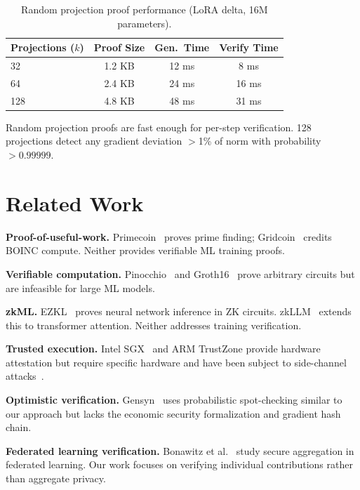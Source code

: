 \documentclass[11pt,letterpaper]{article}
\begin{document}
\begin{table}[t]
\centering
\begin{tabular}{lccc}
\toprule
\textbf{Projections ($k$)} & \textbf{Proof Size} & \textbf{Gen.\ Time} & \textbf{Verify Time} \\
\midrule
32 & 1.2 KB & 12 ms & 8 ms \\
64 & 2.4 KB & 24 ms & 16 ms \\
128 & 4.8 KB & 48 ms & 31 ms \\
\bottomrule
\end{tabular}
\caption{Random projection proof performance (LoRA delta, 16M parameters).}
\label{tab:projection}
\end{table}

Random projection proofs are fast enough for per-step verification.  128 projections detect any gradient deviation $>$1\% of norm with probability $>0.99999$.

\section{Related Work}

\textbf{Proof-of-useful-work.}  Primecoin~\cite{king2013primecoin} proves prime finding; Gridcoin~\cite{gridcoin2014} credits BOINC compute.  Neither provides verifiable ML training proofs.

\textbf{Verifiable computation.}  Pinocchio~\cite{parno2013pinocchio} and Groth16~\cite{groth2016size} prove arbitrary circuits but are infeasible for large ML models.

\textbf{zkML.}  EZKL~\cite{ezkl2023} proves neural network inference in ZK circuits.  zkLLM~\cite{sun2024zkllm} extends this to transformer attention.  Neither addresses training verification.

\textbf{Trusted execution.}  Intel SGX~\cite{costan2016intel} and ARM TrustZone provide hardware attestation but require specific hardware and have been subject to side-channel attacks~\cite{vanBulck2018foreshadow}.

\textbf{Optimistic verification.}  Gensyn~\cite{gensyn2023} uses probabilistic spot-checking similar to our approach but lacks the economic security formalization and gradient hash chain.

\textbf{Federated learning verification.}  Bonawitz et al.~\cite{bonawitz2019towards} study secure aggregation in federated learning.  Our work focuses on verifying individual contributions rather than aggregate privacy.
\end{document}
